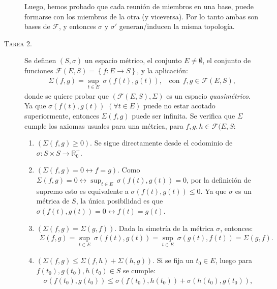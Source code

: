 \documentclass[spanish, fleqn]{article}
\begin{document}
\begin{description}
    Luego, hemos probado que cada reunión de miembros en una base, puede formarse con los miembros de la otra (y viceversa). Por lo tanto ambas son bases de $\mathcal{F}$, y entonces $\sigma$ y $\sigma'$ generan/inducen la misma topología.




    \item[\textsc{Tarea 2.}] Se definen $(S,\sigma)$ un espacio métrico, el conjunto $E \neq \emptyset$, el conjunto de funciones $\mathcal{F}(E,S) = \left\{f: E \rightarrow S \right\}$, y la aplicación:
    \begin{align*}
        \Sigma(f,g) = \sup_{t \in E}\ \sigma \left(f(t),g(t)\right), \ \ \ \ \text{con} \ \ f,g \in \mathcal{F}(E,S),
    \end{align*}
    donde se quiere probar que $(\mathcal{F}(E,S),\Sigma)$ es un espacio \textit{quasimétrico}. Ya que $\sigma \left(f(t),g(t)\right)$ $(\forall t \in E)$ puede no estar acotado superiormente, entonces $\Sigma(f,g)$ puede ser infinita. Se verifica que $\Sigma$ cumple los axiomas usuales para una métrica, para $f,g,h \in \mathcal{F}(E,S$:
    \begin{enumerate}
         \item $\left(\Sigma(f,g) \geq 0 \right)$. Se sigue directamente desde el codominio de $\sigma : S \times S \rightarrow \mathbb{R}_0^+$.
         \item $\left(\Sigma(f,g) = 0 \leftrightarrow f=g \right)$. Como $\Sigma(f,g) = 0 \leftrightarrow \displaystyle \sup_{t \in E} \  \sigma\left(f(t), g(t) \right) = 0$, por la definición de supremo esto es equivalente a $\sigma\left( f(t), g(t) \right) \leq 0$. Ya que $\sigma$ es un métrica de $S$, la única posibilidad es que $\sigma\left(f(t),g(t)\right)=0 \leftrightarrow f(t) = g(t)$.
         \item $\left(\Sigma(f,g) = \Sigma(g,f) \right)$. Dada la simetría de la métrica $\sigma$, entonces:
         \begin{align*}
             \Sigma(f,g) = \sup_{t \in E} \ \sigma\left(f(t), g(t) \right) = \sup_{t \in E} \ \sigma\left(g(t), f(t) \right) = \Sigma(g,f).
         \end{align*}
         \item $\left(\Sigma(f,g) \leq \Sigma(f,h) + \Sigma(h,g) \right)$. Si se fija un $t_0 \in E$, luego para $f(t_0), g(t_0), h(t_0) \in S$ se cumple:
         \begin{align}
             \sigma\left(f(t_0), g(t_0) \right) \leq \sigma\left(f(t_0), h(t_0) \right) + \sigma\left(h(t_0), g(t_0) \right),

\end{align}
\end{enumerate}
\end{description}
\end{document}
